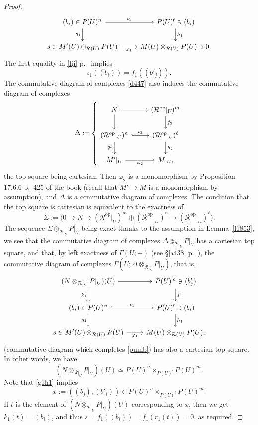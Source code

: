 \documentclass[12pt]{article}%
\theoremstyle{remark}
\theoremstyle{definition}
\newcommand{\cc}{\mathcal}
\newcommand{\pp}{\varphi}
\DeclareMathOperator{\op}{op}
\begin{document}
\begin{proof}
\begin{equation}
\begin{tikzcd}
(b_i)\in P(U)^n\ar[hook]{r}{\iota_1}\ar{d}[swap]{g_1}&P(U)^\ell\ni(b_i)\ar{d}{h_1}\\ 
s\in M'(U)\otimes_{\cc R(U)}P(U)\ar{r}[swap]{\pp_1}&M(U)\otimes_{\cc R(U)}P(U)\ni0.
\end{tikzcd}
\end{equation}
% 
The first equality in \eqref{lij} p.~\pageref{lij} implies  
%
\begin{equation}\label{g1h1}
\iota_1((b_i))=f_1((b'_j)).
\end{equation}
%
The commutative diagram of complexes \eqref{d447} also induces the commutative diagram of complexes 
$$
\Delta:=\left\{
\begin{tikzcd}
N\ar{r}\ar{d}&(\cc R^{\op}|_U)^m\ar{d}{f_2}\\ 
(\cc R^{\op}|_U)^n\ar[hook]{r}{\iota_2}\ar{d}[swap]{g_2}&(\cc R^{\op}|_U)^\ell\ar{d}{h_2}\\ 
M'|_U\ar{r}[swap]{\pp_2}&M|_U,
\end{tikzcd}
\right.
$$
the top square being cartesian. Then $\pp_2$ is a monomorphism by Proposition 17.6.6 p.~425 of the book (recall that $M'\to M$ is a monomorphism by assumption), and $\Delta$ is a commutative diagram of complexes. The condition that the top square is cartesian is equivalent to the exactness of 
%
\begin{equation}\label{tsc2}
\Sigma:=\Big(0\to N\to(\cc R^{\op}|_U)^m\oplus(\cc R^{\op}|_U)^n\to(\cc R^{\op}|_U)^\ell\Big).
\end{equation}
% 
The sequence $\Sigma\otimes_{\cc R|_U}P|_U$ being exact thanks to the assumption in Lemma~\ref{l1853}, we see that the commutative diagram of complexes $\Delta\otimes_{\cc R|_U}P|_U$ has a cartesian top square, and that, by left exactness of $\Gamma(U;-)$ (see \S\ref{a438} p.~\pageref{a438}), the commutative diagram of complexes $\Gamma(U;\Delta\otimes_{\cc R|_U}P|_U)$, that is, 
$$
\begin{tikzcd}
(N\otimes_{\cc R|_U}P|_U)(U)\ar{r}\ar{d}[swap]{k_1}&P(U)^m\ar{d}{f_1}\ni(b'_j)\\ 
(b_i)\in P(U)^n\ar[hook]{r}{\iota_1}\ar{d}[swap]{g_1}&P(U)^\ell\ni(b_i)\ar{d}{h_1}\\ 
s\in M'(U)\otimes_{\cc R(U)}P(U)\ar{r}[swap]{\pp_1}&M(U)\otimes_{\cc R(U)}P(U),
\end{tikzcd}
$$ 
(commutative diagram which completes \eqref{pumb}) has also a cartesian top square. In other words, we have 
$$
(N\otimes_{\cc R|_U}P|_U)(U)\simeq P(U)^n\times_{P(U)^\ell}P(U)^m.
$$ 
Note that \eqref{g1h1} implies 
$$
x:=((b_j),(b'_i))\in P(U)^n\times_{P(U)^\ell}P(U)^m.
$$ 
If $t$ is the element of $(N\otimes_{\cc R|_U}P|_U)(U)$ corresponding to $x$, then we get $k_1(t)=(b_i)$, and thus $s=f_1((b_i))=f_1(r_1(t))=0$, as required.
\end{proof}
\end{document}
